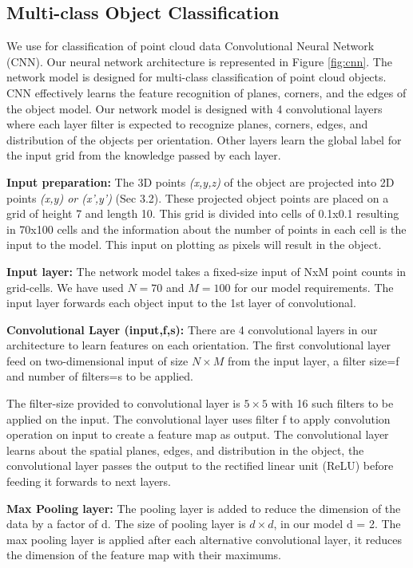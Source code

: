 \subsection{Multi-class Object Classification}
We use for classification of point cloud data Convolutional Neural Network (CNN).
Our neural network architecture is represented in Figure \ref{fig:cnn}.
The network model is designed for multi-class classification of 
point cloud objects.
CNN effectively learns the feature recognition of planes, corners, and the edges of the object model.
Our network model is designed with 4 convolutional layers where each layer filter is expected to
recognize planes, corners, edges, and distribution of the objects per orientation.
Other layers learn the global label for the input grid from the knowledge passed by each layer.

\textbf{Input preparation:}
The 3D points \textit{(x,y,z)} of the object are projected into 2D points \textit{(x,y) or (x',y')} (Sec 3.2).
These projected object points are placed on a grid of height 7 and length 10.
This grid is divided into cells of 0.1x0.1 resulting in 70x100 cells and the information about the number of points in each cell is the input to the model.
This input on plotting as pixels will result in the object.

\textbf{Input layer:}
The network model takes a fixed-size input of NxM point counts in grid-cells. We have
used $N=70$ and $M=100$ for our model requirements. The input layer forwards each object input to the 1st layer
of convolutional.


\textbf{Convolutional Layer (input,f,s):}
There are 4 convolutional layers in our architecture to learn features on each orientation.
The first convolutional layer feed on two-dimensional input of size $N \times  M$ from
the input layer, a filter size=f and number of filters=s to be applied.

The filter-size provided to convolutional layer is $5 \times 5$ with 16 such filters to be applied on the input.
The convolutional layer uses filter f to apply convolution operation on input to create a feature map as output.
The convolutional layer learns about the spatial planes, edges, and distribution in the object,
the convolutional layer passes the output to the rectified linear unit (ReLU) before feeding
it forwards to next layers.

\textbf{Max Pooling layer:}
The pooling layer is added to reduce the dimension of the data by a factor of d. 
The size of pooling layer is  $d \times  d$, in our model d = 2. 
The max pooling layer is applied after each alternative convolutional
layer, it reduces the dimension of the feature map with their maximums.

